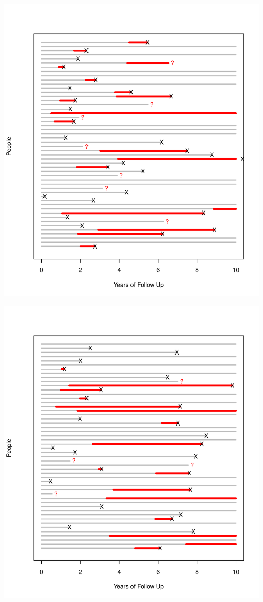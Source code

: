 \documentclass{article}
\begin{document}
\includegraphics{incidence-graphs-one}

\includegraphics{incidence-graphs-two}
\end{document}
